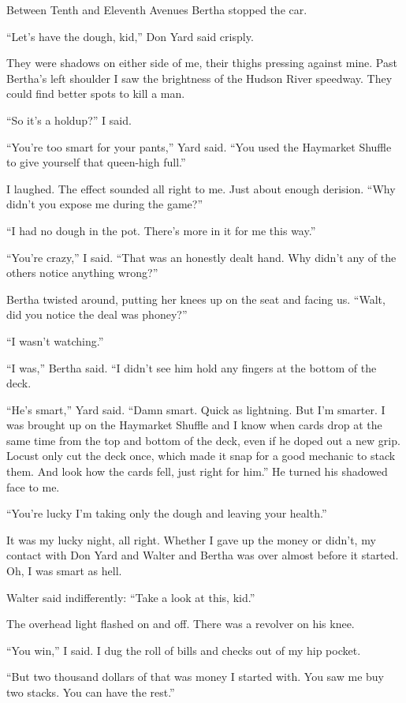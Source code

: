 \documentclass{novel}
\begin{document}
Between Tenth and Eleventh Avenues Bertha stopped the car.

“Let’s have the dough, kid,” Don Yard said crisply.

They were shadows on either side of me, their thighs pressing against mine. Past Bertha’s left shoulder I saw the brightness of the Hudson River speedway. They could find better spots to kill a man.

“So it’s a holdup?” I said.

“You’re too smart for your pants,” Yard said. “You used the Haymarket Shuffle to give yourself that queen-high full.”

I laughed. The effect sounded all right to me. Just about enough derision. “Why didn’t you expose me during the game?”

“I had no dough in the pot. There’s more in it for me this way.”

“You’re crazy,” I said. “That was an honestly dealt hand. Why didn’t any of the others notice anything wrong?”

Bertha twisted around, putting her knees up on the seat and facing us. “Walt, did you notice the deal was phoney?”

“I wasn’t watching.”

“I was,” Bertha said. “I didn’t see him hold any fingers at the bottom of the deck.

“He’s smart,” Yard said. “Damn smart. Quick as lightning. But I’m smarter. I was brought up on the Haymarket Shuffle and I know when cards drop at the same time from the top and bottom of the deck, even if he doped out a new grip. Locust only cut the deck once, which made it snap for a good mechanic to stack them. And look how the cards fell, just right for him.” He turned his shadowed face to me. 

“You’re lucky I’m taking only the dough and leaving your health.”

\scenestars

It was my lucky night, all right. Whether I gave up the money or didn’t, my contact with Don Yard and Walter and Bertha was over almost before it started. Oh, I was smart as hell.

Walter said indifferently: “Take a look at this, kid.” 

The overhead light flashed on and off. There was a revolver on his knee.

“You win,” I said. I dug the roll of bills and checks out of my hip pocket.

“But two thousand dollars of that was money I started with. You saw me buy two stacks. You can have the rest.”
\end{document}
